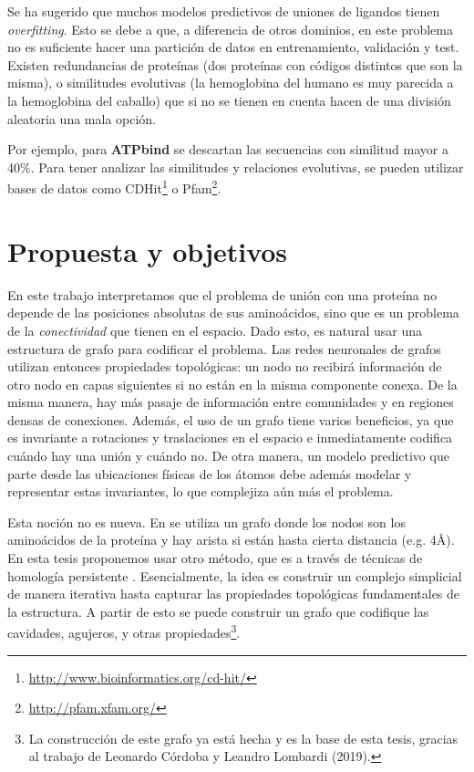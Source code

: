 \documentclass[
    left=2.0cm,         %
    right=2.0cm,        %
    top=2.0cm,          %
    bottom=2.5cm,         %
    bindingoffset=6mm,  %
    nohyphenation=false %
]{eiti/eiti-thesis}
\begin{document}
Se ha sugerido\cite{wallach2018overfitting} que muchos modelos predictivos de
uniones de ligandos tienen \textit{overfitting}. Esto se debe a que, a diferencia
de otros dominios, en este problema no es suficiente hacer una
partición de datos en entrenamiento, validación y test. Existen redundancias
de proteínas (dos proteínas con códigos distintos que son la misma), o similitudes
evolutivas (la hemoglobina del humano es muy parecida a la hemoglobina del caballo) que
si no se tienen en cuenta hacen de una división aleatoria una mala opción.

Por ejemplo, para \textbf{ATPbind} \cite{atpbind} se descartan las secuencias con
similitud mayor a 40\%. Para tener analizar las similitudes y relaciones evolutivas,
se pueden utilizar bases de datos como CDHit\footnote{\url{http://www.bioinformatics.org/cd-hit/}} o
Pfam\footnote{\url{http://pfam.xfam.org/}}.


\newpage
\section{Propuesta y objetivos}
En este trabajo interpretamos que el problema de unión con una proteína no depende 
de las posiciones absolutas de sus aminoácidos, sino que es un problema de la
\textit{conectividad} que tienen en el espacio. Dado esto, es natural usar una
estructura de grafo para codificar el problema. Las redes neuronales de grafos
utilizan entonces propiedades topológicas: un nodo no recibirá información
de otro nodo en capas siguientes si no están en la misma componente conexa. De
la misma manera, hay más pasaje de información entre comunidades y en regiones
densas de conexiones. Además, el uso
de un grafo tiene varios beneficios, ya que es invariante a rotaciones y 
traslaciones en el espacio e inmediatamente codifica cuándo hay una unión y cuándo
no. De otra manera, un modelo predictivo que parte desde las ubicaciones físicas 
de los átomos debe además modelar y representar estas invariantes, lo que complejiza
aún más el problema.

Esta noción no es nueva. En \cite{fout2017proteininterface} se utiliza un grafo
donde los nodos son los aminoácidos de la proteína y hay arista si están hasta
cierta distancia (e.g. 4\r{A}). En esta tesis proponemos usar otro método, 
que es a través de técnicas de homología persistente \cite{edelsbrunner2008perseus}. 
Esencialmente, la idea es construir un complejo simplicial de manera
iterativa hasta capturar las propiedades topológicas fundamentales de la estructura.
A partir de esto se puede construir un grafo que codifique las cavidades, agujeros, y
otras propiedades\footnote{La construcción de este grafo ya está hecha y es la base
de esta tesis, gracias al trabajo de Leonardo Córdoba y Leandro Lombardi (2019).}.
\end{document}
